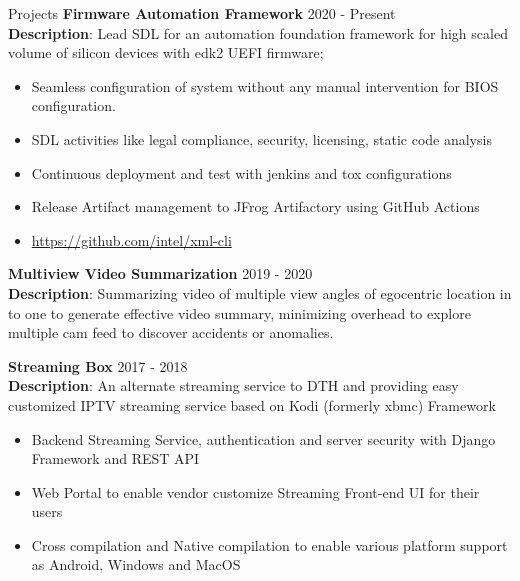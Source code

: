 \documentclass{resume} %
\begin{document}
\begin{rSection}{Projects}
\textbf{Firmware Automation Framework}  \hfill {2020 - Present} \\
\textbf{Description}: Lead SDL for an automation foundation framework for high scaled volume of silicon devices with edk2 UEFI firmware;

\begin{itemize}
    \item Seamless configuration of system without any manual intervention for BIOS configuration.
    \item SDL activities like legal compliance, security, licensing, static code analysis
    \item Continuous deployment and test with jenkins and tox configurations
    \item Release Artifact management to JFrog Artifactory using GitHub Actions
    \item \href{https://github.com/intel/xml-cli}{https://github.com/intel/xml-cli}
\end{itemize}

\textbf{Multiview Video Summarization} \hfill {2019 - 2020}\\
\textbf{Description}: Summarizing video of multiple view angles of egocentric location in to one to generate effective video summary, minimizing overhead to explore multiple cam feed to discover accidents or anomalies.



\textbf{Streaming Box} \hfill {2017 - 2018}\\
\textbf{Description}: An alternate streaming service to DTH and providing easy customized IPTV streaming service based on Kodi (formerly xbmc) Framework

\begin{itemize}
    \item Backend Streaming Service, authentication and server security with Django Framework and REST API
    \item Web Portal to enable vendor customize Streaming Front-end UI for their users
    \item Cross compilation and Native compilation to enable various platform support as Android, Windows and MacOS
\end{itemize}

\end{rSection}
\end{document}
